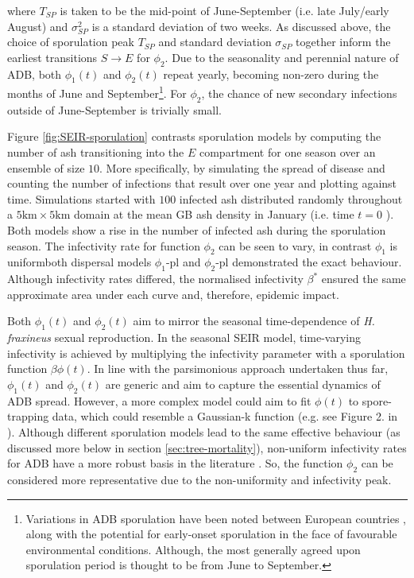 where $T_{SP}$ is taken to be the mid-point of June-September (i.e. late July/early August) and $\sigma_{SP}^2$ is a standard deviation of two weeks.
As discussed above, the choice of sporulation peak $T_{SP}$ and standard deviation $\sigma_{SP}$ together inform the earliest transitions $S\rightarrow E$ for $\phi_2$.
Due to the seasonality and perennial nature of ADB, both $\phi_1(t)$ and $\phi_2(t)$ repeat yearly, becoming non-zero during the months of June and September\footnote{Variations in ADB sporulation have been noted between European countries \cite{https://doi.org/10.1111/mpp.12073}, along with the potential for early-onset sporulation in the face of favourable environmental conditions. Although, the most generally agreed upon sporulation period is thought to be from June to September.}.
For $\phi_2$, the chance of new secondary infections outside of June-September is trivially small.

Figure \ref{fig:SEIR-sporulation} contrasts sporulation models by computing the number of ash transitioning into the $E$ compartment for one season over an ensemble of size $10$.
More specifically, by simulating the spread of disease and counting the number of infections that result over one year and plotting against time.
Simulations started with $100$ infected ash distributed randomly throughout a $\mathrm{5km \times 5km}$ domain at the mean GB ash density in January (i.e. time $t=0$ ).
Both models show a rise in the number of infected ash during the sporulation season.
The infectivity rate for function $\phi_2$ can be seen to vary, in contrast $\phi_1$ is uniform\textemdash both dispersal models $\phi_1$-pl and $\phi_2$-pl demonstrated the exact behaviour.
Although infectivity rates differed, the normalised infectivity $\beta^*$ ensured the same approximate area under each curve and, therefore, epidemic impact.

Both $\phi_1(t)$ and $\phi_2(t)$ aim to mirror the seasonal time-dependence of \textit{H. fraxineus} sexual reproduction.
In the seasonal SEIR model, time-varying infectivity is achieved by multiplying the infectivity parameter with a sporulation function $\beta\phi(t)$.
In line with the parsimonious approach undertaken thus far, $\phi_1(t)$ and $\phi_2(t)$ are generic and aim to capture the essential dynamics of ADB spread.
However, a more complex model could aim to fit $\phi(t)$ to spore-trapping data, which could resemble a Gaussian-k function (e.g. see Figure 2. in \cite{grosdidier2018tracking}).
Although different sporulation models lead to the same effective behaviour (as discussed more below in section \ref{sec:tree-mortality}), 
non-uniform infectivity rates for ADB have a more robust basis in the literature \cite{grosdidier2018tracking, time-varying-infectivity, hietala2013invasive, segarra2001epidemic}.
So, the function $\phi_2$ can be considered more representative due to the non-uniformity and infectivity peak.

